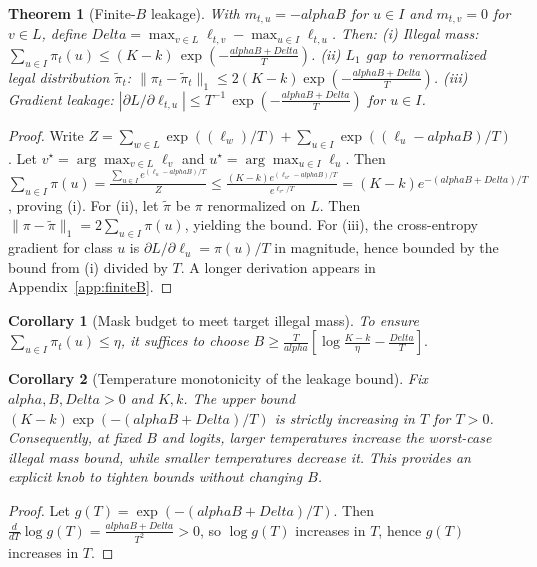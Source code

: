 \documentclass{article}
\def\alpha{alpha}%
\def\Delta{Delta}%
\def\mathcal#1{#1}%
\newtheorem{theorem}{Theorem}
\newtheorem{corollary}{Corollary}
\begin{document}
\begin{theorem}[Finite-$B$ leakage]\label{thm:finiteB}
With $m_{t,u}=-\alpha B$ for $u\in I$ and $m_{t,v}=0$ for $v\in L$, define $\Delta=\max_{v\in L}\ell_{t,v}-\max_{u\in I}\ell_{t,u}$. Then:
(i) Illegal mass: $\sum_{u\in I}\pi_t(u) \le (K-k)\,\exp\!\left(-\frac{\alpha B + \Delta}{T}\right)$.
(ii) $L_1$ gap to renormalized legal distribution $\tilde{\pi}_t$: $\|\pi_t - \tilde{\pi}_t\|_1 \le 2(K-k)\exp\!\left(-\frac{\alpha B + \Delta}{T}\right)$.
(iii) Gradient leakage: $\left|\partial \mathcal{L}/\partial \ell_{t,u}\right| \le T^{-1}\,\exp\!\left(-\frac{\alpha B + \Delta}{T}\right)$ for $u\in I$.
\end{theorem}

\begin{proof}[Proof]
Write $Z=\sum_{w\in L}\exp((\ell_w)/T)+\sum_{u\in I}\exp((\ell_u-\alpha B)/T)$. Let $v^\star=\arg\max_{v\in L}\ell_v$ and $u^\star=\arg\max_{u\in I}\ell_u$. Then
$\sum_{u\in I}\pi(u)=\frac{\sum_{u\in I}e^{(\ell_u-\alpha B)/T}}{Z} \le \frac{(K-k)e^{(\ell_{u^\star}-\alpha B)/T}}{e^{\ell_{v^\star}/T}}=(K-k)e^{-(\alpha B+\Delta)/T}$, proving (i).
For (ii), let $\tilde{\pi}$ be $\pi$ renormalized on $L$. Then $\|\pi-\tilde{\pi}\|_1=2\sum_{u\in I}\pi(u)$, yielding the bound. For (iii), the cross-entropy gradient for class $u$ is $\partial\mathcal{L}/\partial \ell_u = \pi(u)/T$ in magnitude, hence bounded by the bound from (i) divided by $T$. A longer derivation appears in Appendix~\ref{app:finiteB}.
\end{proof}

\begin{corollary}[Mask budget to meet target illegal mass]\label{cor:budget}
To ensure $\sum_{u\in I}\pi_t(u)\le \eta$, it suffices to choose
$B \ge \frac{T}{\alpha}\left[\log\frac{K-k}{\eta}-\frac{\Delta}{T}\right].$
\end{corollary}

\begin{corollary}[Temperature monotonicity of the leakage bound]\label{cor:temp}
Fix $\alpha,B,\Delta>0$ and $K,k$. The upper bound $(K-k)\exp\!(-(\alpha B+\Delta)/T)$ is strictly increasing in $T$ for $T>0$. Consequently, at fixed $B$ and logits, larger temperatures increase the worst-case illegal mass bound, while smaller temperatures decrease it. This provides an explicit knob to tighten bounds without changing $B$.
\end{corollary}

\begin{proof}
Let $g(T) = \exp(-(\alpha B+\Delta)/T)$. Then $\frac{d}{dT}\log g(T) = \frac{\alpha B+\Delta}{T^2}>0$, so $\log g(T)$ increases in $T$, hence $g(T)$ increases in $T$.
\end{proof}
\end{document}
